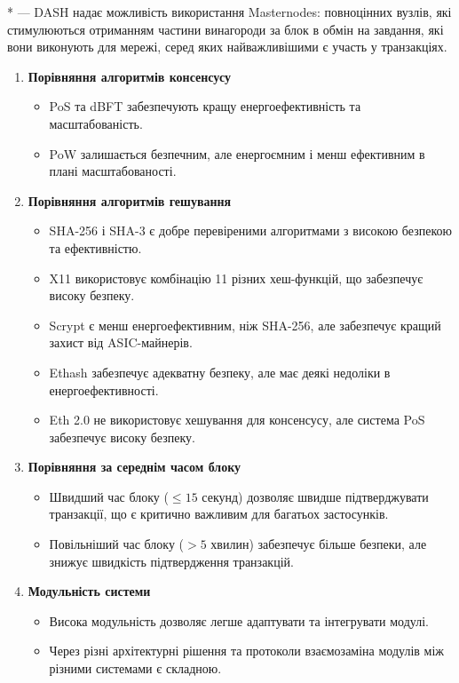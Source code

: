 * --- DASH надає можливість використання Masternodes: повноцінних вузлів, які стимулюються отриманням частини винагороди за блок в обмін на завдання, які вони виконують для мережі, серед яких найважливішими є участь у транзакціях.

\vspace{1cm}
\begin{enumerate}
    \item \textbf{Порівняння алгоритмів консенсусу}
    \begin{itemize}
        \item PoS та dBFT забезпечують кращу енергоефективність та масштабованість.
        \item PoW залишається безпечним, але енергоємним і менш ефективним в плані масштабованості.
    \end{itemize}

    \item \textbf{Порівняння алгоритмів гешування}
    \begin{itemize}
        \item SHA-256 і SHA-3 є добре перевіреними алгоритмами з високою безпекою та ефективністю.
        \item X11 використовує комбінацію 11 різних хеш-функцій, що забезпечує високу безпеку.
        \item Scrypt є менш енергоефективним, ніж SHA-256, але забезпечує кращий захист від ASIC-майнерів.
        \item Ethash забезпечує адекватну безпеку, але має деякі недоліки в енергоефективності.
        \item Eth 2.0 не використовує хешування для консенсусу, але система PoS забезпечує високу безпеку.
    \end{itemize}

    \item \textbf{Порівняння за середнім часом блоку}
    \begin{itemize}
        \item Швидший час блоку ($\leq 15$ секунд) дозволяє швидше підтверджувати транзакції, що є критично важливим для багатьох застосунків.
        \item Повільніший час блоку ($> 5$ хвилин) забезпечує більше безпеки, але знижує швидкість підтвердження транзакцій.
    \end{itemize}

    \item \textbf{Модульність системи}
    \begin{itemize}
        \item Висока модульність дозволяє легше адаптувати та інтегрувати модулі.
        \item Через різні архітектурні рішення та протоколи взаємозаміна модулів між різними системами є складною.
    \end{itemize}


\end{enumerate}
